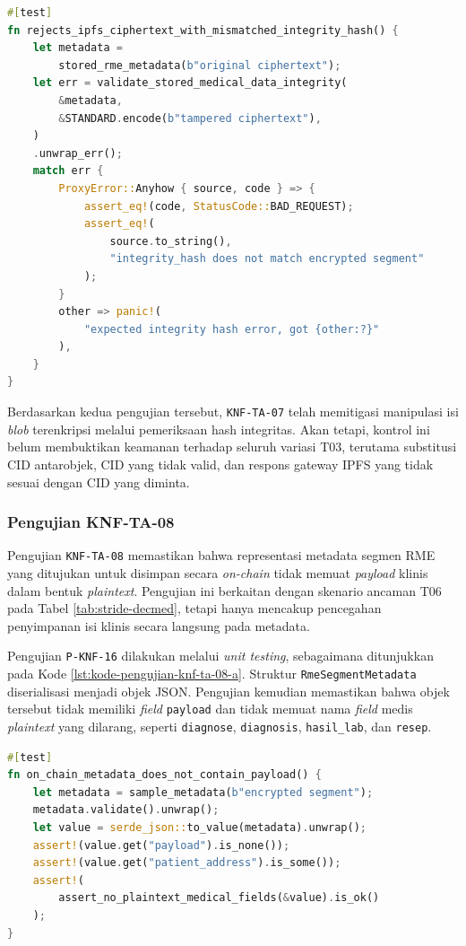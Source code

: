 \documentclass[bahasa, 12pt, a4paper, onecolumn, oneside, final]{report}
\begin{document}
\begin{lstlisting}[language=Rust, caption=Pengujian P-KNF-15 untuk KNF-TA-07, label=lst:kode-pengujian-knf-ta-07-b]
#[test]
fn rejects_ipfs_ciphertext_with_mismatched_integrity_hash() {
    let metadata =
        stored_rme_metadata(b"original ciphertext");
    let err = validate_stored_medical_data_integrity(
        &metadata,
        &STANDARD.encode(b"tampered ciphertext"),
    )
    .unwrap_err();
    match err {
        ProxyError::Anyhow { source, code } => {
            assert_eq!(code, StatusCode::BAD_REQUEST);
            assert_eq!(
                source.to_string(),
                "integrity_hash does not match encrypted segment"
            );
        }
        other => panic!(
            "expected integrity hash error, got {other:?}"
        ),
    }
}
\end{lstlisting}

Berdasarkan kedua pengujian tersebut, \texttt{KNF-TA-07} telah memitigasi manipulasi isi \textit{blob} terenkripsi melalui pemeriksaan hash integritas. Akan tetapi, kontrol ini belum membuktikan keamanan terhadap seluruh variasi T03, terutama substitusi CID antarobjek, CID yang tidak valid, dan respons gateway IPFS yang tidak sesuai dengan CID yang diminta.

\subsubsection{Pengujian KNF-TA-08}
\label{subsubsec:pengujian-knf-ta-08}

Pengujian \texttt{KNF-TA-08} memastikan bahwa representasi metadata segmen RME yang ditujukan untuk disimpan secara \textit{on-chain} tidak memuat \textit{payload} klinis dalam bentuk \textit{plaintext}. Pengujian ini berkaitan dengan skenario ancaman T06 pada Tabel \ref{tab:stride-decmed}, tetapi hanya mencakup pencegahan penyimpanan isi klinis secara langsung pada metadata.

Pengujian \texttt{P-KNF-16} dilakukan melalui \textit{unit testing}, sebagaimana ditunjukkan pada Kode \ref{lst:kode-pengujian-knf-ta-08-a}. Struktur \texttt{RmeSegmentMetadata} diserialisasi menjadi objek JSON. Pengujian kemudian memastikan bahwa objek tersebut tidak memiliki \textit{field} \texttt{payload} dan tidak memuat nama \textit{field} medis \textit{plaintext} yang dilarang, seperti \texttt{diagnose}, \texttt{diagnosis}, \texttt{hasil\_lab}, dan \texttt{resep}.

\begin{lstlisting}[language=Rust, caption=Pengujian P-KNF-16 untuk KNF-TA-08, label=lst:kode-pengujian-knf-ta-08-a]
#[test]
fn on_chain_metadata_does_not_contain_payload() {
    let metadata = sample_metadata(b"encrypted segment");
    metadata.validate().unwrap();
    let value = serde_json::to_value(metadata).unwrap();
    assert!(value.get("payload").is_none());
    assert!(value.get("patient_address").is_some());
    assert!(
        assert_no_plaintext_medical_fields(&value).is_ok()
    );
}
\end{lstlisting}
\end{document}
